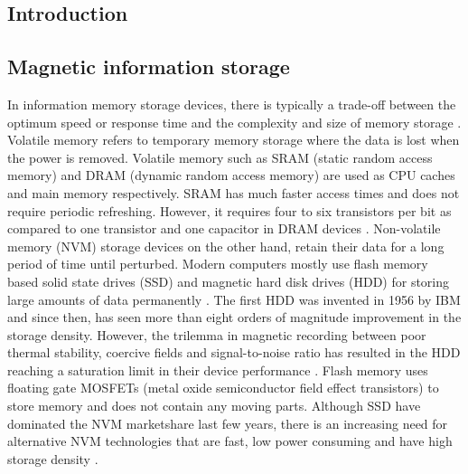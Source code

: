 \documentclass[11pt,edeposit,draftthesis]{uiucthesis2020}
\begin{document}
\begin{mainmatter}

\chapter{Introduction}

\section{Magnetic information storage}

In information memory storage devices, there is typically a trade-off between the optimum speed or response time and the complexity and size of memory storage \cite{Wing1986}. Volatile memory refers to temporary memory storage where the data is lost when the power is removed. Volatile memory such as SRAM (static random access memory) and DRAM (dynamic random access memory) are used as CPU caches and main memory respectively. SRAM has much faster access times and does not require periodic refreshing. However, it requires four to six transistors per bit as compared to one transistor and one capacitor in DRAM devices \cite{Meena2014}. Non-volatile memory (NVM) storage devices on the other hand, retain their data for a long period of time until perturbed. Modern computers mostly use flash memory based solid state drives (SSD) and magnetic hard disk drives (HDD) for storing large amounts of data permanently \cite{Meena2014}. The first HDD was invented in 1956 by IBM and since then, has seen more than eight orders of magnitude improvement in the storage density. However, the trilemma in magnetic recording between poor thermal stability, coercive fields and signal-to-noise ratio has resulted in the HDD reaching a saturation limit in their device performance \cite{Krishnan2016}. Flash memory uses floating gate MOSFETs (metal oxide semiconductor field effect transistors) to store memory and does not contain any moving parts. Although SSD have dominated the NVM marketshare last few years, there is an increasing need for alternative NVM technologies that are fast, low power consuming and have high storage density \cite{Meena2014}.


\end{mainmatter}
\end{document}
